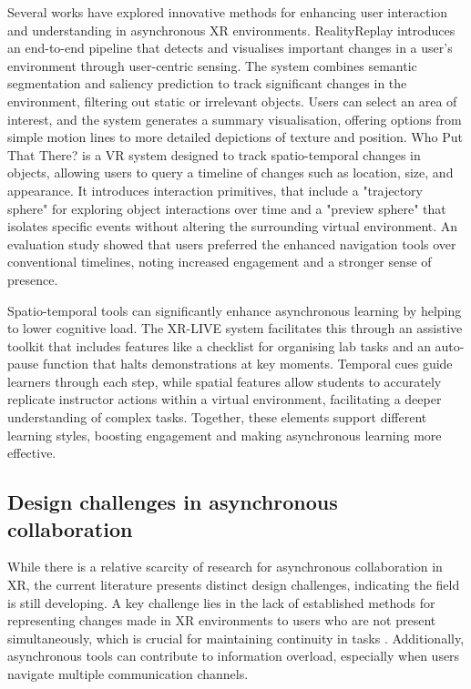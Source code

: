 Several works have explored innovative methods for enhancing user interaction and understanding in asynchronous XR environments. RealityReplay \cite{cho2023realityreplay} introduces an end-to-end pipeline that detects and visualises important changes in a user's environment through user-centric sensing. The system combines semantic segmentation and saliency prediction to track significant changes in the environment, filtering out static or irrelevant objects. Users can select an area of interest, and the system generates a summary visualisation, offering options from simple motion lines to more detailed depictions of texture and position. Who Put That There? \cite{lilija2020put} is a VR system designed to track spatio-temporal changes in objects, allowing users to query a timeline of changes such as location, size, and appearance. It introduces interaction primitives, that include a "trajectory sphere" for exploring object interactions over time and a "preview sphere" that isolates specific events without altering the surrounding virtual environment. An evaluation study showed that users preferred the enhanced navigation tools over conventional timelines, noting increased engagement and a stronger sense of presence.

Spatio-temporal tools can significantly enhance asynchronous learning by helping to lower cognitive load. The XR-LIVE system \cite{thanyadit2022xr} facilitates this through an assistive toolkit that includes features like a checklist for organising lab tasks and an auto-pause function that halts demonstrations at key moments. Temporal cues guide learners through each step, while spatial features allow students to accurately replicate instructor actions within a virtual environment, facilitating a deeper understanding of complex tasks. Together, these elements support different learning styles, boosting engagement and making asynchronous learning more effective.

\subsection{Design challenges in asynchronous collaboration}

While there is a relative scarcity of research for asynchronous collaboration in XR, the current literature presents distinct design challenges, indicating the field is still developing. A key challenge lies in the lack of established methods for representing changes made in XR environments to users who are not present simultaneously, which is crucial for maintaining continuity in tasks \cite{pidel2020collaboration}. Additionally, asynchronous tools can contribute to information overload, especially when users navigate multiple communication channels. 

